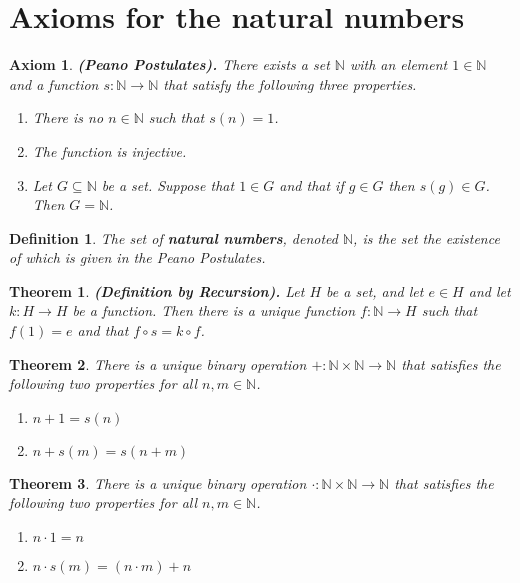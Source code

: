 \documentclass{article}
\newtheorem{theorem}{Theorem}
\newtheorem*{definition}{Definition}
\newtheorem*{axiom}{Axiom}
\newcommand{\N}{\mathbb{N}}
\begin{document}
\section{Axioms for the natural numbers}

\begin{axiom}
	\textbf{(Peano Postulates).} There exists a set $\N$ with an element $1 \in \N$ and a function $s: \N \rightarrow \N$ that satisfy the following three properties.
	\begin{enumerate}
		\item[a.] There is no $n \in \N$ such that $s(n) = 1$.
		\item[b.] The function is injective.
		\item[c.] Let $G \subseteq \N$ be a set. Suppose that $1 \in G$ and that if $g \in G$ then $s(g) \in G$. Then $G = \N$.
	\end{enumerate}
\end{axiom}

\begin{definition}
	The set of \textbf{natural numbers}, denoted $\N$, is the set the existence of which is given in the Peano Postulates.
\end{definition}

\begin{theorem}
	\textbf{(Definition by Recursion).} Let $H$ be a set, and let $e \in H$ and let $k: H \rightarrow H$ be a function. Then there is a unique function $f: \N \rightarrow H$ such that $f(1) = e$ and that $f \circ s = k \circ f$.
\end{theorem}

\begin{theorem}
	There is a unique binary operation $+: \N \times \N \rightarrow \N$ that satisfies the following two properties for all $n,m \in \N$.
	\begin{enumerate}
		\item[a.] $n + 1 = s(n)$
		\item[b.] $n + s(m) = s(n + m)$
	\end{enumerate}
\end{theorem}

\begin{theorem}
	There is a unique binary operation $\cdot : \N \times \N \rightarrow \N$ that satisfies the following two properties for all $n,m \in \N$.
	\begin{enumerate}
		\item[a.] $n \cdot 1 = n$
		\item[b.] $n \cdot s(m) = (n \cdot m) + n$
	\end{enumerate}
\end{theorem}
\end{document}
